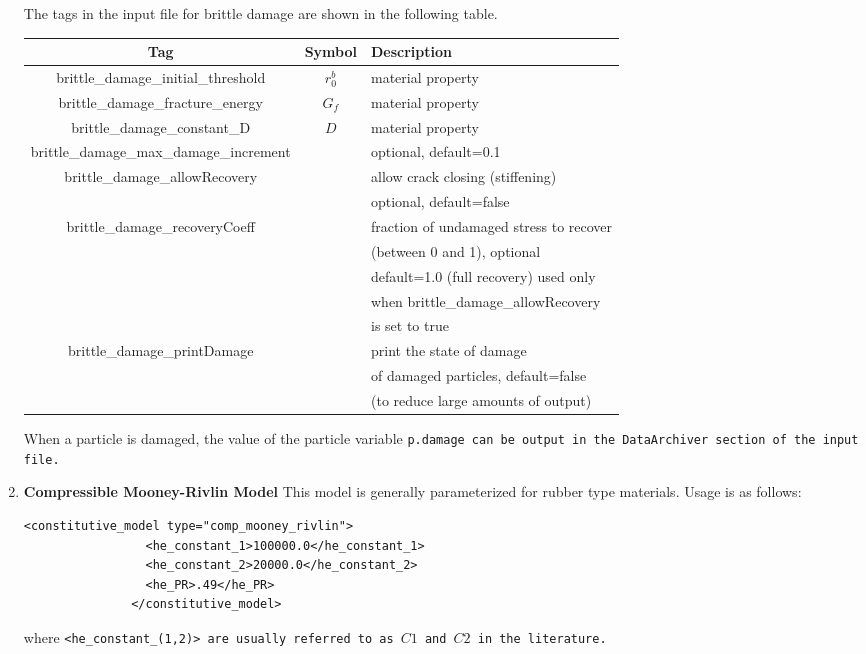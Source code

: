 \begin{enumerate}
\begin{Verbatim}[fontsize=\footnotesize]
\end{Verbatim}

The tags in the input file for brittle damage are shown in the following table.

\begin{table}[ht]
\centering
\begin{tabular} {c c l}
\hline
Tag & Symbol & Description \\
\hline
brittle\_damage\_initial\_threshold & $r_0^b$ &  material property \\
brittle\_damage\_fracture\_energy & $G_f$ &  material property \\
brittle\_damage\_constant\_D & $D$ & material property \\
brittle\_damage\_max\_damage\_increment & & optional, default=0.1 \\
brittle\_damage\_allowRecovery & & allow crack closing (stiffening) \\
& & optional, default=false \\
brittle\_damage\_recoveryCoeff & & fraction of undamaged stress to recover\\
& & (between 0 and 1), optional\\
& & default=1.0 (full recovery) used only\\
& & when brittle\_damage\_allowRecovery \\
& & is set to true  \\
brittle\_damage\_printDamage & & print the state of damage \\
& & of damaged particles, default=false \\
& & (to reduce large amounts of output) \\
\hline
\end{tabular}
\end{table}

When a particle is damaged, the value of the particle variable \tt p.damage \normalfont
can be output in the \tt DataArchiver \normalfont section of the input file.

\item{\bf Compressible Mooney-Rivlin Model} This model is generally parameterized
for rubber type materials.  Usage is as follows:
\begin{Verbatim}[fontsize=\footnotesize]
              <constitutive_model type="comp_mooney_rivlin">
                 <he_constant_1>100000.0</he_constant_1>
                 <he_constant_2>20000.0</he_constant_2>
                 <he_PR>.49</he_PR>
               </constitutive_model>
\end{Verbatim}
where \tt <he\_constant\_(1,2)> \normalfont are usually referred to
as $C1$ and $C2$ in the literature.


\end{enumerate}
